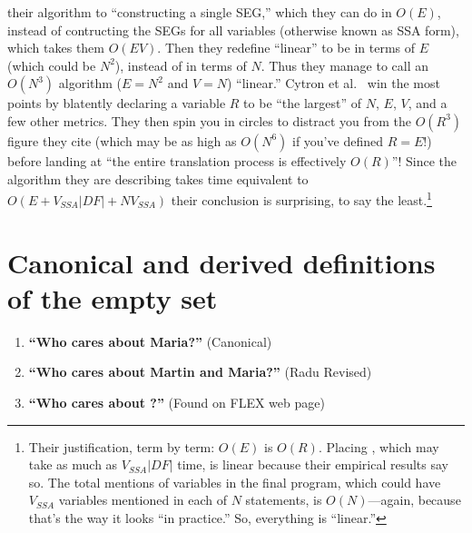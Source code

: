 \documentclass[12pt,titlepage,twoside]{article}
\let\oldsection\section
\renewcommand{\section}{\setcounter{figure}{0}\setcounter{table}{0}\oldsection}
\begin{document}
{\begin{enumerate}
their algorithm to ``constructing a single SEG,'' which they can do in
$O(E)$, instead of contructing the SEGs for all variables (otherwise
known as SSA form), which takes them $O(EV)$.  Then they redefine
``linear'' to be in terms of $E$ (which could be $N^2$), instead of in
terms of $N$.  Thus they manage to call an $O(N^3)$ algorithm ($E=N^2$
and $V=N$) ``linear.''  Cytron et al.\ \cite{cytron91:ssa} win the
most points by blatently declaring a variable $R$ to be ``the
largest'' of $N$, $E$, $V$, and a few other metrics.  They then spin
you in circles to distract you from the $O(R^3)$ figure they cite
(which may be as high as $O(N^6)$ if you've defined $R=E$!) before
landing at ``the entire translation process is effectively $O(R)$''!
Since the algorithm they are describing takes time equivalent to
$O(E+V_{SSA}|{DF}|+NV_{SSA})$ their conclusion is surprising, to say
the least.\footnote{Their justification, term by term: $O(E)$ is
$O(R)$.  Placing , which may take as much as
$V_{SSA}|{DF}|$ time, is linear because their empirical results say
so.  The total mentions of variables in the final program, which could
have $V_{SSA}$ variables mentioned in each of $N$ statements, is
$O(N)$---again, because that's the way it looks ``in practice.''  So,
everything is ``linear.''}
\end{enumerate}

\section{Canonical and derived definitions of the empty set}
\begin{enumerate}
\item \textbf{``Who cares about Maria?''} (Canonical) \cite{marinov99}
\item \textbf{``Who cares about Martin and Maria?''} (Radu Revised)
\item \textbf{``Who cares about ?''} (Found on FLEX web page)
\end{enumerate}
} %
\end{document}
